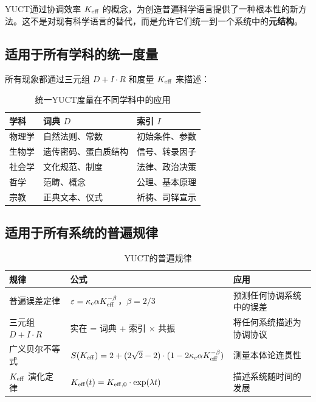 \documentclass[11pt,a4paper]{article}
\begin{document}
	YUCT通过协调效率 \(\Keff\) 的概念，为创造普遍科学语言提供了一种根本性的新方法。这不是对现有科学语言的替代，而是允许它们统一到一个系统中的\textbf{元结构}。
	
	\subsection{适用于所有学科的统一度量}
	
	所有现象都通过三元组 \(D + I \cdot R\) 和度量 \(\Keff\) 来描述：
	
	\begin{table}[H]
		\centering
		\caption{统一YUCT度量在不同学科中的应用}
		\label{tab:unified-metrics}
		\begin{tabular}{p{3.5cm}p{4.5cm}p{4.5cm}}
			\toprule
			\textbf{学科} & \textbf{词典 \(D\)} & \textbf{索引 \(I\)} \\
			\midrule
			物理学 & 自然法则、常数 & 初始条件、参数 \\
			生物学 & 遗传密码、蛋白质结构 & 信号、转录因子 \\
			社会学 & 文化规范、制度 & 法律、政治决策 \\
			哲学 & 范畴、概念 & 公理、基本原理 \\
			宗教 & 正典文本、仪式 & 祈祷、司铎宣示 \\
			\bottomrule
		\end{tabular}
	\end{table}
	
	\subsection{适用于所有系统的普遍规律}
	
	\begin{table}[H]
		\centering
		\caption{YUCT的普遍规律}
		\label{tab:universal-laws}
		\begin{tabular}{p{5cm}p{6cm}p{5cm}}
			\toprule
			\textbf{规律} & \textbf{公式} & \textbf{应用} \\
			\midrule
			普遍误差定律 & \(\varepsilon = \kappa_c \alpha \Keff^{-\beta}\)，\(\beta = 2/3\) & 预测任何协调系统中的误差 \\
			三元组 \(D + I \cdot R\) & 实在 = 词典 + 索引 × 共振 & 将任何系统描述为协调协议 \\
			广义贝尔不等式 & \(S(\Keff) = 2 + (2\sqrt{2}-2)\cdot(1 - 2\kappa_c \alpha \Keff^{-\beta})\) & 测量本体论连贯性 \\
			\(\Keff\) 演化定律 & \(\Keff(t) = \Keff[0] \cdot \exp(\lambda t)\) & 描述系统随时间的发展 \\
			\bottomrule
		\end{tabular}
	\end{table}
	
\end{document}
